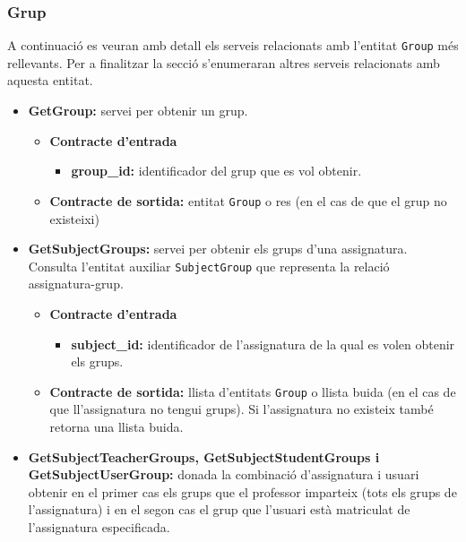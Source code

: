 		
		\subsubsection{Grup}
		A continuació es veuran amb detall els serveis relacionats amb l'entitat \texttt{Group} més rellevants. Per a finalitzar la secció s'enumeraran altres serveis relacionats amb aquesta entitat.
		
		\begin{itemize}
			\item \textbf{GetGroup:} servei per obtenir un grup.
			
				\begin{itemize}
					\item \textbf{Contracte d'entrada}
						\begin{itemize}
							\item \textbf{group\_id:} identificador del grup que es vol obtenir.
						\end{itemize}
					\item \textbf{Contracte de sortida:} entitat \texttt{Group} o res (en el cas de que el grup no existeixi)
				\end{itemize}
			\item \textbf{GetSubjectGroups:} servei per obtenir els grups d'una assignatura. Consulta l'entitat auxiliar \texttt{SubjectGroup} que representa la relació assignatura-grup.
				\begin{itemize}
					\item \textbf{Contracte d'entrada}
						\begin{itemize}
							\item \textbf{subject\_id:} identificador de l'assignatura de la qual es volen obtenir els grups.
						\end{itemize}
					\item \textbf{Contracte de sortida:} llista d'entitats \texttt{Group} o llista buida (en el cas de que ll'assignatura no tengui grups). Si l'assignatura no existeix també retorna una llista buida.
				\end{itemize}
			
			
			\item \textbf{GetSubjectTeacherGroups, GetSubjectStudentGroups i GetSubjectUserGroup:} donada la combinació d'assignatura i usuari obtenir en el primer cas els grups que el professor imparteix (tots els grups de l'assignatura) i en el segon cas el grup que l'usuari està matriculat de l'assignatura especificada.\\
			

\end{itemize}
